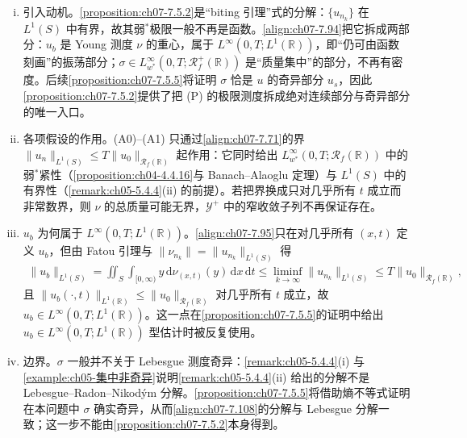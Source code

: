 \documentclass[../../main.tex]{subfiles}%
\begin{document}
\begin{remark}\label{remark:ch07-7.5.2动机}
\begin{enumerate}[(i)]
\item 引入动机。\cref{proposition:ch07-7.5.2}是“biting 引理”式的分解：$\{u_{n_k}\}$ 在 $L^1(S)$ 中有界，故其弱$^*$极限一般不再是函数。\eqref{align:ch07-7.94}把它拆成两部分：$u_b$ 是 Young 测度 $\nu$ 的重心，属于 $L^\infty(0,T;L^1(\mathbb{R}))$，即“仍可由函数刻画”的振荡部分；$\sigma\in L^\infty_{w^*}(0,T;\mathscr{R}_f^+(\mathbb{R}))$ 是“质量集中”的部分，不再有密度。后续\cref{proposition:ch07-7.5.5}将证明 $\sigma$ 恰是 $u$ 的奇异部分 $u_s$，因此\cref{proposition:ch07-7.5.2}提供了把 (P) 的极限测度拆成绝对连续部分与奇异部分的唯一入口。
\item 各项假设的作用。(A0)--(A1) 只通过\eqref{align:ch07-7.71}的界 $\|u_n\|_{L^1(S)}\leqslant T\|u_0\|_{\mathscr{R}_f(\mathbb{R})}$ 起作用：它同时给出 $L^\infty_{w^*}(0,T;\mathscr{R}_f(\mathbb{R}))$ 中的弱$^*$紧性（\cref{proposition:ch04-4.4.16}与 Banach--Alaoglu 定理）与 $L^1(S)$ 中的有界性（\cref{remark:ch05-5.4.4}(ii) 的前提）。若把界换成只对几乎所有 $t$ 成立而非常数界，则 $\nu$ 的总质量可能无界，$\mathcal{Y}^+$ 中的窄收敛子列不再保证存在。
\item $u_b$ 为何属于 $L^\infty(0,T;L^1(\mathbb{R}))$。\eqref{align:ch07-7.95}只在对几乎所有 $(x,t)$ 定义 $u_b$，但由 Fatou 引理与 $\|\nu_{n_k}\|=\|u_{n_k}\|_{L^1(S)}$ 得
\begin{align*}
\|u_b\|_{L^1(S)}=\iint_S\int_{[0,\infty)}y\,\mathrm{d}\nu_{(x,t)}(y)\,\mathrm{d}x\,\mathrm{d}t\leqslant\liminf_{k\to\infty}\|u_{n_k}\|_{L^1(S)}\leqslant T\|u_0\|_{\mathscr{R}_f(\mathbb{R})},
\end{align*}
且 $\|u_b(\cdot,t)\|_{L^1(\mathbb{R})}\leqslant\|u_0\|_{\mathscr{R}_f(\mathbb{R})}$ 对几乎所有 $t$ 成立，故 $u_b\in L^\infty(0,T;L^1(\mathbb{R}))$。这一点在\cref{proposition:ch07-7.5.5}的证明中给出 $u_b\in L^\infty(0,T;L^1(\mathbb{R}))$ 型估计时被反复使用。
\item 边界。$\sigma$ 一般并不关于 Lebesgue 测度奇异：\cref{remark:ch05-5.4.4}(i) 与\cref{example:ch05-集中非奇异}说明\cref{remark:ch05-5.4.4}(ii) 给出的分解不是 Lebesgue--Radon--Nikodým 分解。\cref{proposition:ch07-7.5.5}将借助熵不等式证明在本问题中 $\sigma$ 确实奇异，从而\eqref{align:ch07-7.108}的分解与 Lebesgue 分解一致；这一步不能由\cref{proposition:ch07-7.5.2}本身得到。
\end{enumerate}
\end{remark}
\end{document}
